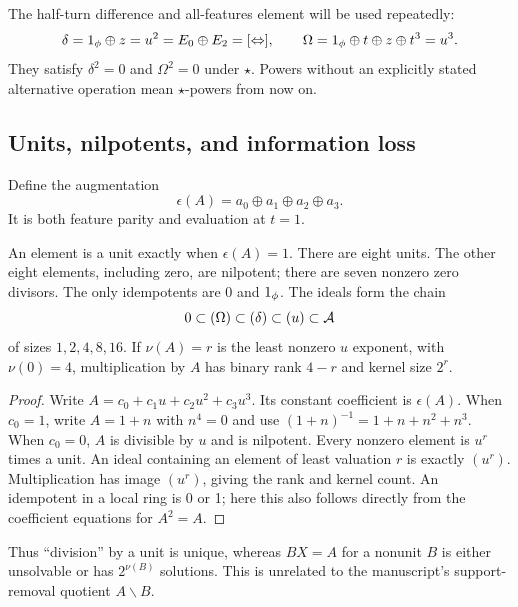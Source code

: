 The half-turn difference and all-features element will be used repeatedly:
\begin{equation}\label{eq:specials}
 \delta=1_{\phi}\oplus z=u^2=E_0\oplus E_2=[\Leftrightarrow],\qquad
 \Omega=1_{\phi}\oplus t\oplus z\oplus t^3=u^3.
\end{equation}
They satisfy $\delta^2=0$ and $\Omega^2=0$ under $\star$. Powers without an explicitly stated alternative operation mean $\star$-powers from now on.

\subsection{Units, nilpotents, and information loss}
Define the augmentation
\begin{equation}
 \epsilon(A)=a_0\oplus a_1\oplus a_2\oplus a_3.
\end{equation}
It is both feature parity and evaluation at $t=1$.
\begin{theorem}\label{thm:classification}
An element is a unit exactly when $\epsilon(A)=1$. There are eight units. The other eight elements, including zero, are nilpotent; there are seven nonzero zero divisors. The only idempotents are $0$ and $1_{\phi}$.
The ideals form the chain
\begin{equation}\label{eq:ideals}
 0\subset(\Omega)\subset(\delta)\subset(u)\subset\mathcal A
\end{equation}
of sizes $1,2,4,8,16$. If $\nu(A)=r$ is the least nonzero $u$ exponent, with $\nu(0)=4$, multiplication by $A$ has binary rank $4-r$ and kernel size $2^r$.
\end{theorem}
\begin{proof}
Write $A=c_0+c_1u+c_2u^2+c_3u^3$. Its constant coefficient is $\epsilon(A)$. When $c_0=1$, write $A=1+n$ with $n^4=0$ and use $(1+n)^{-1}=1+n+n^2+n^3$. When $c_0=0$, $A$ is divisible by $u$ and is nilpotent. Every nonzero element is $u^r$ times a unit. An ideal containing an element of least valuation $r$ is exactly $(u^r)$. Multiplication has image $(u^r)$, giving the rank and kernel count. An idempotent in a local ring is 0 or 1; here this also follows directly from the coefficient equations for $A^2=A$.
\end{proof}
Thus ``division'' by a unit is unique, whereas $BX=A$ for a nonunit $B$ is either unsolvable or has $2^{\nu(B)}$ solutions. This is unrelated to the manuscript's support-removal quotient $A\backslash B$.


